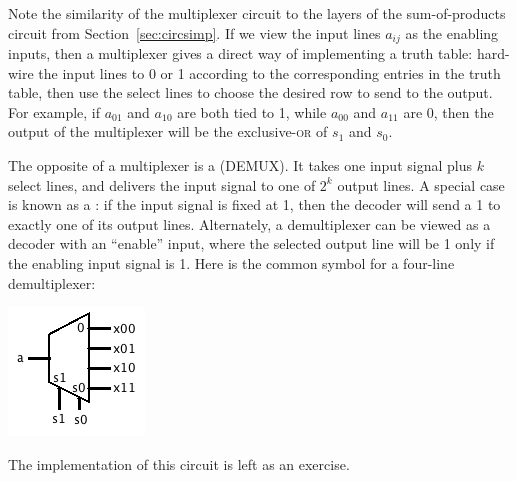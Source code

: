 Note the similarity of the multiplexer circuit to the layers of the sum-of-products circuit from Section~\ref{sec:circsimp}. If we view the input lines $a_{ij}$ as the enabling inputs, then a multiplexer gives a direct way of implementing a truth table: hard-wire the input lines to 0 or 1 according to the corresponding entries in the truth table, then use the select lines to choose the desired row to send to the output. For example, if $a_{01}$ and $a_{10}$ are both tied to 1, while $a_{00}$ and $a_{11}$ are 0, then the output of the multiplexer will be the exclusive-\textsc{or} of $s_1$ and $s_0$.

The opposite of a multiplexer is a  (DEMUX). It takes one input signal plus $k$ select lines, and delivers the input signal to one of $2^k$ output lines. A special case is known as a : if the input signal is fixed at 1, then the decoder will send a 1 to exactly one of its output lines. Alternately, a demultiplexer can be viewed as a decoder with an ``enable'' input, where the selected output line will be 1 only if the enabling input signal is 1. Here is the common symbol for a four-line demultiplexer:
\begin{center}
\includegraphics[width=!,height=!,scale=0.75]{graphics/DEMUX.png}
\end{center}
The implementation of this circuit is left as an exercise.

